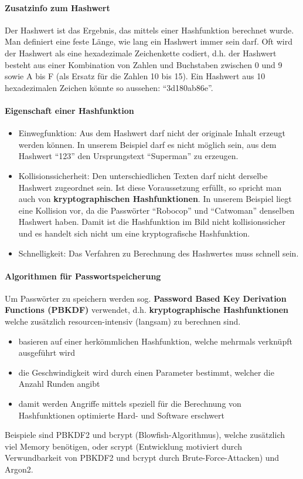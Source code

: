 \documentclass[10pt,a4paper]{article}
\begin{document}
\paragraph*{Zusatzinfo zum Hashwert}Der Hashwert ist das Ergebnis, das mittels einer Hashfunktion berechnet wurde. Man definiert eine feste Länge, wie lang ein Hashwert immer sein darf. Oft wird der Hashwert als eine hexadezimale Zeichenkette codiert, d.h. der Hashwert besteht aus einer Kombination von Zahlen und Buchstaben zwischen 0 und 9 sowie A bis F (als Ersatz für die Zahlen 10 bis 15). Ein Hashwert aus 10 hexadezimalen Zeichen könnte so aussehen: "`3d180ab86e"'.

\paragraph*{Eigenschaft einer Hashfunktion}
\begin{itemize}[noitemsep,topsep=0pt,leftmargin=*]
    \item Einwegfunktion: Aus dem Hashwert darf nicht der originale Inhalt erzeugt werden können. In unserem Beispiel darf es nicht möglich sein, aus dem Hashwert "`123"' den Ursprungstext "`Superman"' zu erzeugen.
    \item Kollisionssicherheit: Den unterschiedlichen Texten darf nicht derselbe Hashwert zugeordnet sein. Ist diese Voraussetzung erfüllt, so spricht man auch von \textbf{kryptographischen Hashfunktionen}. In unserem Beispiel liegt eine Kollision vor, da die Passwörter "`Robocop"' und "`Catwoman"' denselben Hashwert haben. Damit ist die Hashfunktion im Bild nicht kollisionssicher und es handelt sich nicht um eine kryptografische Hashfunktion.
    \item Schnelligkeit: Das Verfahren zu Berechnung des Hashwertes muss schnell sein.
\end{itemize}

\paragraph*{Algorithmen für Passwortspeicherung}Um Passwörter zu speichern werden sog. \textbf{Password Based Key Derivation Functions (PBKDF)} verwendet, d.h. \textbf{kryptographische Hashfunktionen} welche zusätzlich resourcen-intensiv (langsam) zu berechnen sind.
\begin{itemize}[noitemsep,topsep=0pt,leftmargin=*]
    \item basieren auf einer herkömmlichen Hashfunktion, welche mehrmals verknüpft ausgeführt wird
    \item die Geschwindigkeit wird durch einen Parameter bestimmt, welcher die Anzahl Runden angibt
    \item damit werden Angriffe mittels speziell für die Berechnung von Hashfunktionen optimierte Hard- und Software erschwert
\end{itemize}
Beispiele sind PBKDF2 und bcrypt (Blowfish-Algorithmus), welche zusätzlich viel Memory benötigen, oder scrypt (Entwicklung motiviert durch Verwundbarkeit von PBKDF2 und bcrypt durch Brute-Force-Attacken) und Argon2.
\end{document}
